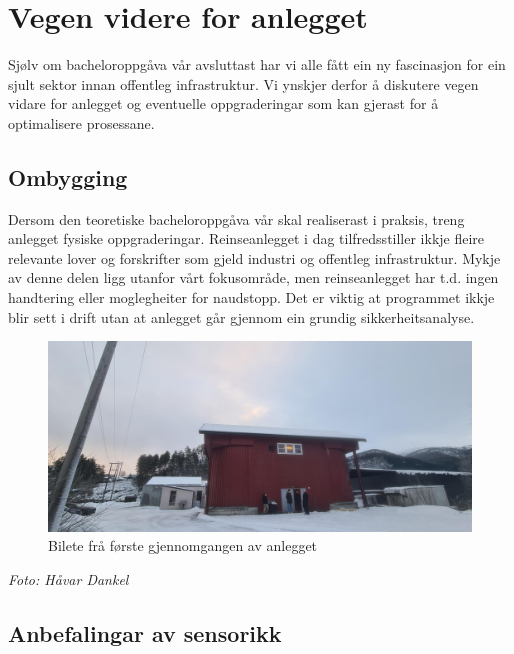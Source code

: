 \section{Vegen videre for anlegget}
\thispagestyle{fancy}

Sjølv om bacheloroppgåva vår avsluttast har vi alle fått ein ny fascinasjon for ein sjult sektor innan offentleg infrastruktur. 
Vi ynskjer derfor å diskutere vegen vidare for anlegget og eventuelle oppgraderingar som kan gjerast
for å optimalisere prosessane.


\subsection{Ombygging}

Dersom den teoretiske bacheloroppgåva vår skal realiserast i praksis, treng anlegget fysiske oppgraderingar.
Reinseanlegget i dag tilfredsstiller ikkje fleire relevante lover og forskrifter som gjeld industri og offentleg infrastruktur.
Mykje av denne delen ligg utanfor vårt fokusområde, men reinseanlegget har t.d. ingen handtering eller moglegheiter for naudstopp.
Det er viktig at programmet ikkje blir sett i drift utan at anlegget går gjennom ein grundig sikkerheitsanalyse.

\begin{figure}[htbp]
    \centering
    \includegraphics[width=1\textwidth]{Bilder/SandeGjennomgang.jpg}
    \caption{Bilete frå første gjennomgangen av anlegget}\label{fig:Bilete Gjennomgang}
\end{figure}

\begin{center}
    \textit{Foto: Håvar Dankel}
\end{center}

\newpage

\subsection{Anbefalingar av sensorikk}


